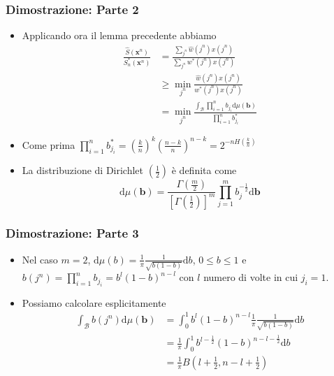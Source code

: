 \documentclass{beamer}
\theoremstyle{plain}
\theoremstyle{definition}
\theoremstyle{remark}
\newcommand{\x}{\bm{x}}
\newcommand{\B}{\bm{b}}
\newcommand{\Sh}{\hat{S}}
\newcommand{\dmu}{\text{d}\mu(\B)}
\begin{document}
\begin{frame}
\frametitle{Dimostrazione: Parte 2}
\begin{itemize}
\item Applicando ora il lemma precedente abbiamo
\begin{equation*}
\begin{split}
\frac{\Sh(\x^n)}{S_n^*(\x^n)}&=\frac{\sum_{j^n}{\hat{w}(j^n)x(j^n)}}{\sum_{j^n}{w^*(j^n)x(j^n)}}\\
& \geq \min\limits_{j^n}\frac{\hat{w}(j^n)x(j^n)}{w^*(j^n)x(j^n)}\\
& = \min\limits_{j^n}\frac{\int_\mathcal{B}{\prod_{i = 1}^n{b_{j_i}}\dmu}}{\prod_{i =1}^n b^*_{j_i}}
\end{split}
\end{equation*}
\item Come prima $\prod_{i = 1}^n{b^*_{j_i}}=\left(\frac{k}{n}\right)^k\left(\frac{n-k}{n}\right)^{n-k} = 2^{-nH\left(\frac{k}{n}\right)}$
\item La distribuzione di Dirichlet $\left(\frac{1}{2}\right)$ è definita come
\begin{equation*}
\dmu = \frac{\Gamma\left(\frac{m}{2}\right)}{\left[\Gamma\left(\frac{1}{2}\right)\right]^m}\prod_{j =1}^m{b_j^{-\frac{1}{2}}}\text{d}\B
\end{equation*}
\end{itemize}
\end{frame}

\begin{frame}
\frametitle{Dimostrazione: Parte 3}
\begin{itemize}
\item Nel caso $m=2$, $\text{d}\mu(b) = \frac{1}{\pi}\frac{1}{\sqrt{b(1-b)}}\text{d}b$, $0\leq b\leq 1$ e $b(j^n) =\prod_{i = 1}^n{b_{j_i}}= b^l(1-b)^{n-l}$ con $l$ numero di volte in cui $j_i=1$.
\item Possiamo calcolare esplicitamente
\begin{equation*}
\begin{split}
\int_\mathcal{B}{b(j^n)}\dmu& = \int_{0}^1{b^l(1-b)^{n-l}\frac{1}{\pi}\frac{1}{\sqrt{b(1-b)}}\text{d}b}\\
&= \frac{1}{\pi}\int_{0}^{1}{b^{l-\frac{1}{2}}(1-b)^{n-l-\frac{1}{2}}\text{d}b}\\
& = \frac{1}{\pi}B\left(l+\frac{1}{2},n-l+\frac{1}{2}\right)
\end{split}
\end{equation*}
\end{itemize}
\end{frame}
\end{document}

